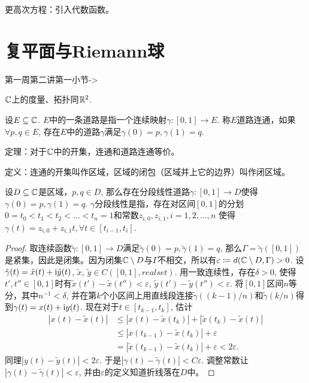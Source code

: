 更高次方程：引入代数函数。

\section{复平面与Riemann球}
第一周第二讲第一小节->

$\mathbb{C}$上的度量、拓扑同$\mathbb{R}^2$.

设$E\subseteq\mathbb{C}$. $E$中的一条道路是指一个连续映射$\gamma\colon [0,1]\to E$. 称$E$道路连通，如果$\forall p,q\in E$, 存在$E$中的道路$\gamma$满足$\gamma(0)=p,\gamma(1)=q$.

定理：对于$\mathbb{C}$中的开集，连通和道路连通等价。

定义：连通的开集叫作区域，区域的闭包（区域并上它的边界）叫作闭区域。

\begin{theorem}
    设$D\subseteq\mathbb{C}$是区域，$p,q\in D$, 那么存在分段线性道路$\gamma\colon [0,1]\to D$使得$\gamma(0)=p,\gamma(1)=q$. $\gamma$分段线性是指，存在对区间$[0,1]$的分划$0=t_0<t_1<t_2<\dots<t_n=1$和常数$z_{i,0},z_{i,1},i=1,2,\dots,n$ 使得$\gamma(t)=z_{i,0}+z_{i,1}t,\forall t\in [t_{i-1},t_i]$.
\end{theorem}
\begin{proof}
    取连续函数$\tilde\gamma\colon [0,1]\to D$满足$\tilde\gamma(0)=p,\tilde\gamma(1)=q$, 那么$\Gamma=\tilde\gamma([0,1])$是紧集，因此是闭集。因为闭集$\mathbb{C}\setminus D$与$\Gamma$不相交，所以有$\varepsilon\coloneq d(\mathbb{C}\setminus D,\Gamma)>0$. 设$\tilde{\gamma}(t)=\tilde{x}(t)+\mathrm{i}\tilde{y}(t)$, $\tilde{x}$, $\tilde{y}\in C([0,1],realset)$. 用一致连续性，存在$\delta>0$, 使得$t',t''\in [0,1]$时有$\tilde{x}(t')-\tilde{x}(t'')<\varepsilon$, $\tilde{y}(t')-\tilde{y}(t'')<\varepsilon$. 将$[0,1]$区间$n$等分，其中$n^{-1}<\delta$, 并在第$k$个小区间上用直线段连接$\tilde{\gamma}((k-1)/n)$和$\tilde{\gamma}(k/n)$得到$\gamma(t)=x(t)+\mathrm{i} y(t)$. 现在对于$t\in [t_{k-1},t_k]$, 估计
    \begin{align*}
        |x(t)-\tilde x(t)|&\leqslant |x(t)-\tilde x(t_k)|+|\tilde x(t_k)-\tilde x(t)|
        \\ &\leqslant |x(t_{k-1})-\tilde x(t_k)|+\varepsilon
        \\ &=|\tilde x(t_{k-1})-\tilde x(t_k)|+\varepsilon<2\varepsilon.
    \end{align*}
    同理$|y(t)-\tilde y(t)|<2\varepsilon$. 于是$|\gamma(t)-\tilde{\gamma}(t)|<C\varepsilon$. 调整常数让$|\gamma(t)-\tilde{\gamma}(t)|<\varepsilon$, 并由$\varepsilon$的定义知道折线落在$D$中。%
\end{proof}

